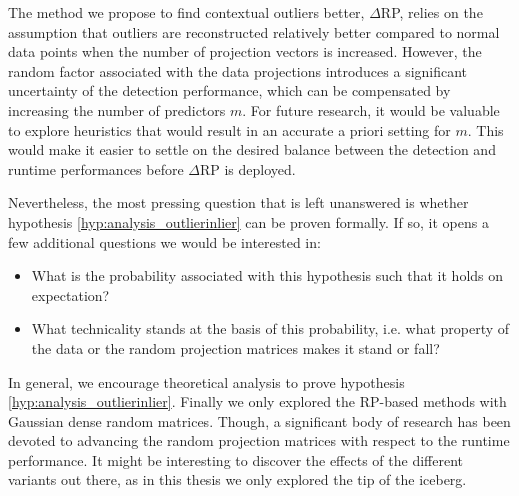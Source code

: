 The method we propose to find contextual outliers better, $\Delta$RP, relies on the assumption that outliers are reconstructed relatively better compared to normal data points when the number of projection vectors is increased. However, the random factor associated with the data projections introduces a significant uncertainty of the detection performance, which can be compensated by increasing the number of predictors $m$. For future research, it would be valuable to explore heuristics that would result in an accurate a priori setting for $m$. This would make it easier to settle on the desired balance between the detection and runtime performances before $\Delta$RP is deployed.

Nevertheless, the most pressing question that is left unanswered is whether hypothesis \ref{hyp:analysis_outlierinlier} can be proven formally. If so, it opens a few additional questions we would be interested in:
\begin{itemize}
	\item What is the probability associated with this hypothesis such that it holds on expectation?
	\item What technicality stands at the basis of this probability, i.e. what property of the data or the random projection matrices makes it stand or fall?
\end{itemize}

In general, we encourage theoretical analysis to prove hypothesis \ref{hyp:analysis_outlierinlier}. Finally we only explored the RP-based methods with Gaussian dense random matrices. Though, a significant body of research has been devoted to advancing the random projection matrices with respect to the runtime performance. It might be interesting to discover the effects of the different variants out there, as in this thesis we only explored the tip of the iceberg.
